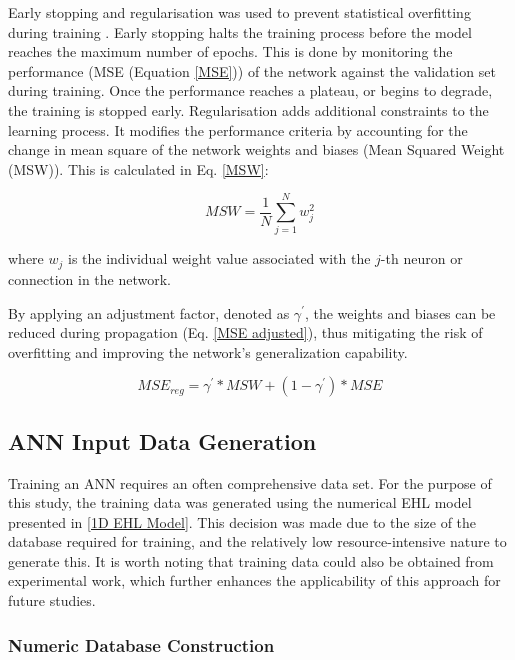 Early stopping and regularisation was used to prevent statistical overfitting during training \cite{MatlabOverfit}. Early stopping halts the training process before the model reaches the maximum number of epochs. This is done by monitoring the performance (MSE (Equation \ref{MSE})) of the network against the validation set during training. Once the performance reaches a plateau, or begins to degrade, the training is stopped early. Regularisation adds additional constraints to the learning process. It modifies the performance criteria by accounting for the change in mean square of the network weights and biases (Mean Squared Weight (MSW)). This is calculated in Eq. \ref{MSW}: 

\begin{equation}\label{MSW}
	M S W=\frac{1}{N} \sum_{j=1}^N w_j^2
\end{equation}

where $w_j$ is the individual weight value associated with the $j$-th neuron or connection in the network.

By applying an adjustment factor, denoted as $\gamma^{\prime}$, the weights and biases can be reduced during propagation (Eq. \ref{MSE adjusted}), thus mitigating the risk of overfitting and improving the network's generalization capability.

\begin{equation}\label{MSE adjusted}
	M S E_{r e g}=\gamma^{\prime} * M S W+\left(1-\gamma^{\prime}\right) * M S E
\end{equation}


\subsection{ANN Input Data Generation}

Training an ANN requires an often comprehensive data set. For the purpose of this study, the training data was generated using the numerical EHL model presented in \ref{1D EHL Model}. This decision was made due to the size of the database required for training, and the relatively low resource-intensive nature to generate this. It is worth noting that training data could also be obtained from experimental work, which further enhances the applicability of this approach for future studies.

\subsubsection{Numeric Database Construction}


